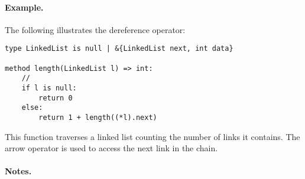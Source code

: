 \paragraph{Example.} The following illustrates the dereference operator:

\begin{lstlisting}
type LinkedList is null | &{LinkedList next, int data}

method length(LinkedList l) => int:
    //
    if l is null:
        return 0
    else:
        return 1 + length((*l).next)
\end{lstlisting}

This function traverses a linked list counting the number of links it contains.  The arrow operator is used to access the next link in the chain.

\paragraph{Notes.}

